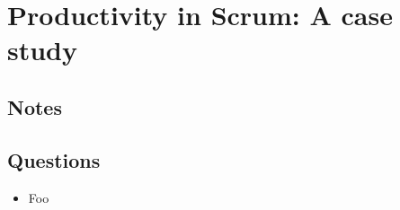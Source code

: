 \section{Productivity in Scrum: A case study \cite{dongen2011productivity}}
\subsection{Notes}

\subsection{Questions}
\begin{itemize}
  \item Foo
\end{itemize}
